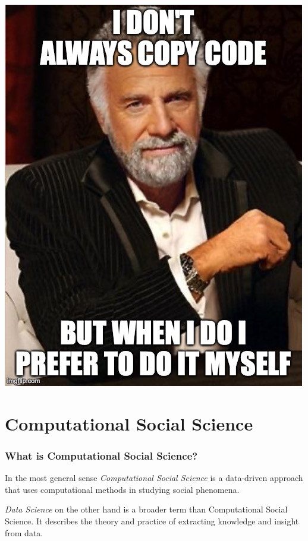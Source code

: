 \documentclass{beamer}
\begin{document}
\begin{frame}
{\begin{center}
            \includegraphics[width = .5\textwidth]{chatgpt_meme.jpg}
        \end{center}
    }
    
\end{frame}

\section[CSS]{Computational Social Science}

\begin{frame}
    \frametitle{What is Computational Social Science?}
    \begin{definition}{}
        In the most general sense \emph{Computational Social Science} is a data-driven approach that uses computational methods in studying social phenomena.
    \end{definition}
    \begin{definition}{}
        \emph{Data Science} on the other hand is a broader term than Computational Social Science. It describes the theory and practice of extracting knowledge and insight from data.
    \end{definition}
\end{frame}
\end{document}
